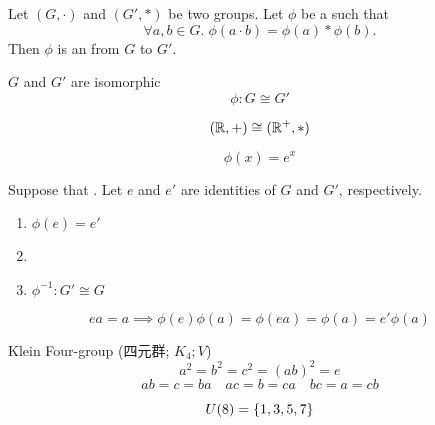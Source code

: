 
\begin{frame}
  \begin{definition}[Isomorphism (同构)]
    Let $(G, \cdot)$ and $(G', \ast)$ be two groups.
    Let $\phi$ be a  such that
    \[
      \forall a, b \in G.\; \phi(a \cdot b) = \phi(a) \ast \phi(b).
    \]
    Then $\phi$ is an  from $G$ to $G'$.
  \end{definition}

  \pause
  \vspace{0.50cm}
  \begin{center}
    $G$ and $G'$ are isomorphic
    \[
      \phi: G \cong G'
    \]
  \end{center}
\end{frame}

\begin{frame}{}
  \begin{exampleblock}{}
    \[
      (\mathbb{R}, +) \cong (\mathbb{R}^{+}, \ast)
    \]
  \end{exampleblock}

  \pause
  \[
    \phi(x) = e^{x}
  \]
\end{frame}

\begin{frame}{}
  \begin{theorem}
    Suppose that .
    Let $e$ and $e'$ are identities of $G$ and $G'$, respectively.

    \begin{enumerate}[(1)]
      \setlength{\itemsep}{6pt}
      \item $\phi(e) = e'$
      \item {}
      \item $\phi^{-1}: G' \cong G$
    \end{enumerate}
  \end{theorem}

  \pause
  \[
    ea = a \implies \phi(e)\phi(a) = \phi(ea) = \phi(a) = e'\phi(a)
  \]
\end{frame}

\begin{frame}{}
  \begin{exampleblock}{Klein Four-group (四元群; $K_{4}; V$)}
    \[
      a^2 = b^2 = c^2 = (ab)^{2} = e
    \]
    \[
      ab = c = ba \quad ac = b = ca \quad bc = a = cb
    \]

    \pause
    \[
      U(8) = \{1, 3, 5, 7\}
    \]
  \end{exampleblock}
\end{frame}
